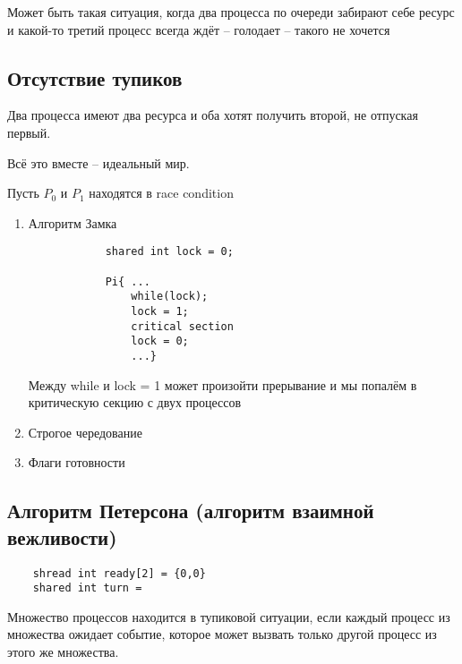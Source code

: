 \documentclass{book}
\theoremstyle{definition}
\begin{document}
Может быть такая ситуация, когда два процесса по очереди забирают себе ресурс и какой-то третий процесс всегда ждёт -- голодает -- такого не хочется

\subsection{Отсутствие тупиков}

Два процесса имеют два ресурса и оба хотят получить второй, не отпуская первый.

Всё это вместе -- идеальный мир.

Пусть $P_0$ и $P_1$ находятся в race condition

\begin{enumerate}
    \item Алгоритм Замка

        \begin{lstlisting}
            shared int lock = 0;

            Pi{ ...
                while(lock);
                lock = 1;
                critical section
                lock = 0;
                ...}
        \end{lstlisting}

        Между while и lock = 1 может произойти прерывание и мы попалём в критическую секцию с двух процессов

    \item Строгое чередование

    \item Флаги готовности


\end{enumerate}

\subsection{Алгоритм Петерсона (алгоритм взаимной вежливости)}

\begin{lstlisting}
    shread int ready[2] = {0,0}
    shared int turn = 
\end{lstlisting}

\begin{definition}
    Множество процессов находится в тупиковой ситуации, если каждый процесс из множества ожидает событие, которое может вызвать только другой процесс из этого же множества.
\end{definition}
\end{document}
